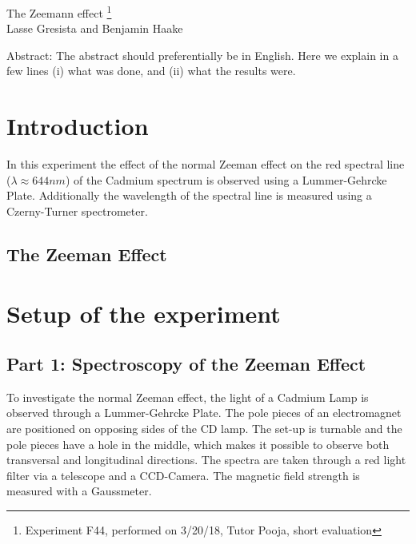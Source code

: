 \documentclass[12pt]{article}
\begin{document}
\thispagestyle{empty}     %
\null
\vspace{40mm}
\begin{center}
{%
\Large  The Zeemann effect
\footnote{\noindent Experiment F44, performed on 3/20/18, Tutor Pooja, short evaluation}}\\[15mm]
Lasse Gresista and Benjamin Haake

\vspace{25mm}

\parbox{0.9\textwidth}{   %
Abstract:    
\small The abstract should preferentially be in English. Here we explain in a
few lines (i) what was done, and (ii) what the results were.
}
\end{center}

\vfill
\vspace{20mm}

\newpage  
\null\thispagestyle{empty}

\newpage
{}

\section{Introduction}
In this experiment the effect of the normal Zeeman effect on the red spectral line ($\lambda\approx644nm$) of the Cadmium spectrum is observed using a Lummer-Gehrcke Plate. Additionally the wavelength of the spectral line is measured using a Czerny-Turner spectrometer.

\subsection{The Zeeman Effect}
\subsection{}


\section{Setup of the experiment}
\subsection{Part 1: Spectroscopy of the Zeeman Effect}
To investigate the normal Zeeman effect, the light of a Cadmium Lamp is observed through a Lummer-Gehrcke Plate. The pole pieces of an electromagnet are positioned on opposing sides of the CD lamp. The set-up is turnable and the pole pieces have a hole in the middle, which makes it possible to observe both transversal and longitudinal directions. The spectra are taken through a red light filter via a telescope and a CCD-Camera. The magnetic field strength is measured with a Gaussmeter.
\end{document}
